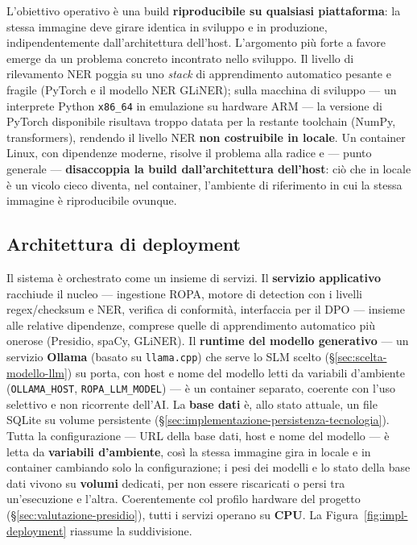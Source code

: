 L'obiettivo operativo è una build \textbf{riproducibile su qualsiasi piattaforma}: la stessa immagine deve girare identica in sviluppo e in produzione, indipendentemente dall'architettura dell'host. L'argomento più forte a favore emerge da un problema concreto incontrato nello sviluppo. Il livello di rilevamento NER poggia su uno \textit{stack} di apprendimento automatico pesante e fragile (PyTorch e il modello NER GLiNER); sulla macchina di sviluppo --- un interprete Python \texttt{x86\_64} in emulazione su hardware ARM --- la versione di PyTorch disponibile risultava troppo datata per la restante toolchain (NumPy, transformers), rendendo il livello NER \textbf{non costruibile in locale}. Un container Linux, con dipendenze moderne, risolve il problema alla radice e --- punto generale --- \textbf{disaccoppia la build dall'architettura dell'host}: ciò che in locale è un vicolo cieco diventa, nel container, l'ambiente di riferimento in cui la stessa immagine è riproducibile ovunque.

\subsection{Architettura di deployment}
\label{sub:container-architettura}

Il sistema è orchestrato come un insieme di servizi. Il \textbf{servizio applicativo} racchiude il nucleo --- ingestione ROPA, motore di detection con i livelli regex/checksum e NER, verifica di conformità, interfaccia per il DPO --- insieme alle relative dipendenze, comprese quelle di apprendimento automatico più onerose (Presidio, spaCy, GLiNER). Il \textbf{runtime del modello generativo} --- un servizio \textbf{Ollama} (basato su \texttt{llama.cpp}) che serve lo SLM scelto (§\ref{sec:scelta-modello-llm}) su porta, con host e nome del modello letti da variabili d'ambiente (\texttt{OLLAMA\_HOST}, \texttt{ROPA\_LLM\_MODEL}) --- è un container separato, coerente con l'uso selettivo e non ricorrente dell'AI. La \textbf{base dati} è, allo stato attuale, un file SQLite su volume persistente (§\ref{sec:implementazione-persistenza-tecnologia}). Tutta la configurazione --- URL della base dati, host e nome del modello --- è letta da \textbf{variabili d'ambiente}, così la stessa immagine gira in locale e in container cambiando solo la configurazione; i pesi dei modelli e lo stato della base dati vivono su \textbf{volumi} dedicati, per non essere riscaricati o persi tra un'esecuzione e l'altra. Coerentemente col profilo hardware del progetto (§\ref{sec:valutazione-presidio}), tutti i servizi operano su \textbf{CPU}. La Figura~\ref{fig:impl-deployment} riassume la suddivisione.

